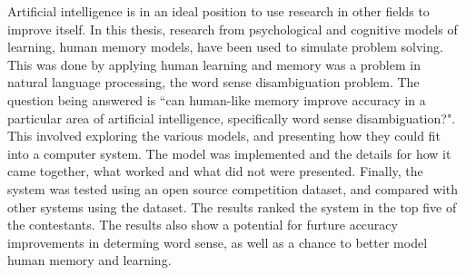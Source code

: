 
Artificial intelligence is in an ideal position to use research in other fields
to improve itself.  In this thesis, research from psychological and cognitive
models of learning, human memory models, have been used to simulate problem
solving.  This was done by applying human learning and memory was a problem in
natural language processing, the word sense disambiguation problem. The question being answered is ``can human-like memory improve accuracy in a particular area of artificial intelligence, specifically word sense disambiguation?". This involved exploring the various models, and presenting how they could fit into a computer system.  The model was implemented and the details for how it came together, what worked and what did not were presented.  Finally, the system was tested using an open source competition dataset, and compared with other systems using the dataset.  The results ranked the system in the top five of the contestants. The results also show a potential for furture accuracy improvements in determing word sense, as well as a chance to better model human memory and learning.
